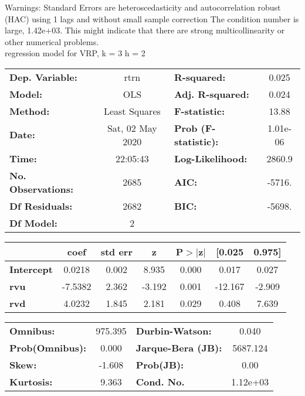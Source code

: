 Warnings: \newline
 [1] Standard Errors are heteroscedasticity and autocorrelation robust (HAC) using 1 lags and without small sample correction \newline
 [2] The condition number is large, 1.42e+03. This might indicate that there are \newline
 strong multicollinearity or other numerical problems.\\ 

regression model for VRP, k = 3 h = 2\begin{center}
\begin{tabular}{lclc}
\toprule
\textbf{Dep. Variable:}    &       rtrn       & \textbf{  R-squared:         } &     0.025   \\
\textbf{Model:}            &       OLS        & \textbf{  Adj. R-squared:    } &     0.024   \\
\textbf{Method:}           &  Least Squares   & \textbf{  F-statistic:       } &     13.88   \\
\textbf{Date:}             & Sat, 02 May 2020 & \textbf{  Prob (F-statistic):} &  1.01e-06   \\
\textbf{Time:}             &     22:05:43     & \textbf{  Log-Likelihood:    } &    2860.9   \\
\textbf{No. Observations:} &        2685      & \textbf{  AIC:               } &    -5716.   \\
\textbf{Df Residuals:}     &        2682      & \textbf{  BIC:               } &    -5698.   \\
\textbf{Df Model:}         &           2      & \textbf{                     } &             \\
\bottomrule
\end{tabular}
\begin{tabular}{lcccccc}
                   & \textbf{coef} & \textbf{std err} & \textbf{z} & \textbf{P$> |$z$|$} & \textbf{[0.025} & \textbf{0.975]}  \\
\midrule
\textbf{Intercept} &       0.0218  &        0.002     &     8.935  &         0.000        &        0.017    &        0.027     \\
\textbf{rvu}       &      -7.5382  &        2.362     &    -3.192  &         0.001        &      -12.167    &       -2.909     \\
\textbf{rvd}       &       4.0232  &        1.845     &     2.181  &         0.029        &        0.408    &        7.639     \\
\bottomrule
\end{tabular}
\begin{tabular}{lclc}
\textbf{Omnibus:}       & 975.395 & \textbf{  Durbin-Watson:     } &    0.040  \\
\textbf{Prob(Omnibus):} &   0.000 & \textbf{  Jarque-Bera (JB):  } & 5687.124  \\
\textbf{Skew:}          &  -1.608 & \textbf{  Prob(JB):          } &     0.00  \\
\textbf{Kurtosis:}      &   9.363 & \textbf{  Cond. No.          } & 1.12e+03  \\
\bottomrule
\end{tabular}
\end{center}

